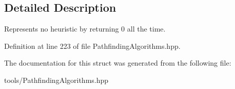 \subsection{Detailed Description}
Represents no heuristic by returning 0 all the time. 

Definition at line 223 of file Pathfinding\+Algorithms.\+hpp.



The documentation for this struct was generated from the following file\+:\begin{DoxyCompactItemize}
\item 
tools/Pathfinding\+Algorithms.\+hpp\end{DoxyCompactItemize}
